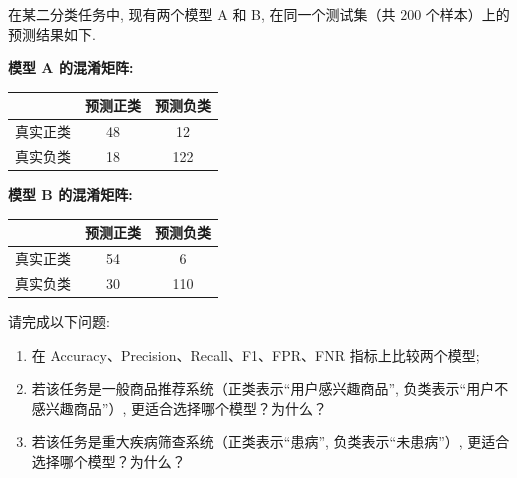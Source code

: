 \documentclass[11pt,letter,notitlepage]{ctexart}
\theoremstyle{definition}
\begin{document}
    \newpage

    \begin{exercise}[模型评估指标比较]
    在某二分类任务中, 现有两个模型 A 和 B, 在同一个测试集（共 $200$ 个样本）上的预测结果如下. 

    \medskip
    \textbf{模型 A 的混淆矩阵: }

    \begin{center}
    \renewcommand{\arraystretch}{1.3}
    \begin{tabular}{|c|c|c|}
        \hline
         & 预测正类 & 预测负类 \\
        \hline
        真实正类 & 48 & 12 \\
        \hline
        真实负类 & 18 & 122 \\
        \hline
    \end{tabular}
    \end{center}

    \medskip
    \textbf{模型 B 的混淆矩阵: }

    \begin{center}
    \renewcommand{\arraystretch}{1.3}
    \begin{tabular}{|c|c|c|}
        \hline
         & 预测正类 & 预测负类 \\
        \hline
        真实正类 & 54 & 6 \\
        \hline
        真实负类 & 30 & 110 \\
        \hline
    \end{tabular}
    \end{center}

    \medskip
    请完成以下问题: 
    \begin{enumerate}[label=(\arabic*)]
        \item 在 Accuracy、Precision、Recall、F1、FPR、FNR 指标上比较两个模型; 
        \item 若该任务是一般商品推荐系统（正类表示“用户感兴趣商品”, 负类表示“用户不感兴趣商品”）, 更适合选择哪个模型？为什么？
        \item 若该任务是重大疾病筛查系统（正类表示“患病”, 负类表示“未患病”）, 更适合选择哪个模型？为什么？
    \end{enumerate}
    \end{exercise}
    
    \newpage

\begin{solution}

\end{solution}
\end{document}
